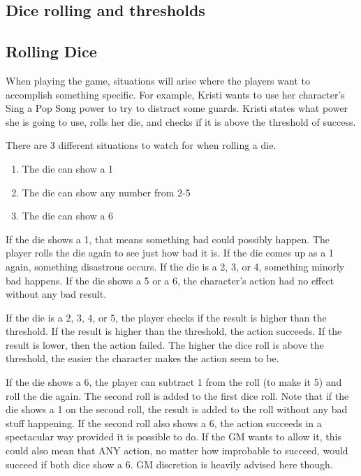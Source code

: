 \begin{flushleft}

\chapter{Dice rolling and thresholds}

\section*{Rolling Dice}

When playing the game, situations will arise where the players want to
accomplish something specific. For example, Kristi wants to use her character's
Sing a Pop Song power to try to distract some guards. Kristi states what power
she is going to use, rolls her die, and checks if it is above the
threshold of success.

There are 3 different situations to watch for when rolling a die.

\begin{enumerate}
    \item{The die can show a 1}
    \item{The die can show any number from 2-5}
    \item{The die can show a 6}
\end{enumerate}

If the die shows a 1, that means something bad could possibly happen. The
player rolls the die again to see just how bad it is. If the die comes up as a
1 again, something disastrous occurs. If the die is a 2, 3, or 4, something
minorly bad happens. If the die shows a 5 or a 6, the character's action
had no effect without any bad result.

If the die is a 2, 3, 4, or 5, the player checks if the result is higher than
the threshold. If the result is higher than the threshold, the action succeeds.
If the result is lower, then the action failed. The higher the dice roll is
above the threshold, the easier the character makes the action seem to be.

If the die shows a 6, the player can subtract 1 from the roll (to make it 5)
and roll the die again. The second roll is added to the first dice roll. Note
that if the die shows a 1 on the second roll, the result is added to the roll
without any bad stuff happening. If the second roll also shows a 6, the action
succeeds in a spectacular way provided it is possible to do.
If the GM wants to allow it, this could also mean that ANY action, no matter
how improbable to succeed, would succeed if both dice show a 6. GM discretion
is heavily advised here though.


\end{flushleft}
